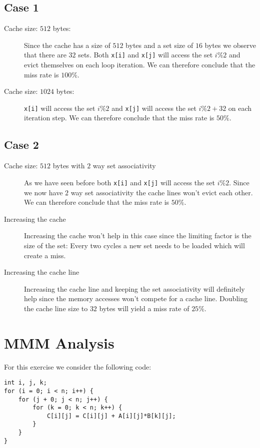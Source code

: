 \documentclass[portrait,a4paper]{article}
\begin{document}
\subsection{Case 1}
\begin{description}
\item[Cache size: $512$ bytes:]
    Since the cache has a size of $512$ bytes and a set size of $16$ bytes we observe that there are $32$ sets.
Both \lstinline{x[i]} and \lstinline{x[j]} will access the set $i\% 2$ and evict themselves on each loop iteration. We can therefore conclude that the miss rate is $100\%$.
\item[Cache size: $1024$ bytes:] \lstinline{x[i]} will access the set $i\% 2$ and \lstinline{x[j]} will access the set $i\% 2 + 32$ on each iteration step. We can therefore conclude that the miss rate is $50\%$.
\end{description}

\subsection{Case 2}
\begin{description}
\item[Cache size: $512$ bytes with $2$ way set associativity] As we have seen before both \lstinline{x[i]} and \lstinline{x[j]} will access the set $i\% 2$. Since we now have $2$ way set associativity the cache lines won't evict each other. We can therefore conclude that the miss rate is $50\%$. 
\item[Increasing the cache] Increasing the cache won't help in this case since the limiting factor is the size of the set: Every two cycles a new set needs to be loaded which will create a miss. 
\item[Increasing the cache line] Increasing the cache line and keeping the set associativity will definitely help since the memory accesses won't compete for a cache line. Doubling the cache line size to $32$ bytes will yield a miss rate of $25\% $.
\end{description}

\section{MMM Analysis}

For this exercise we consider the following code:
\begin{lstlisting}
int i, j, k;
for (i = 0; i < n; i++) {
    for (j + 0; j < n; j++) {
        for (k = 0; k < n; k++) {
            C[i][j] = C[i][j] + A[i][j]*B[k][j];
        }
    }
} 
\end{lstlisting}
\end{document}
